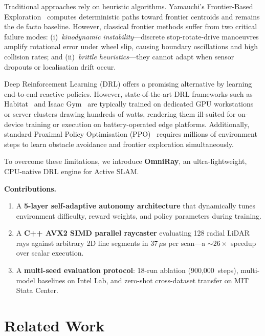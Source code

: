 \documentclass[conference]{IEEEtran}
\begin{document}
Traditional approaches rely on heuristic algorithms.
Yamauchi's Frontier-Based Exploration~\cite{yamauchi1997} computes deterministic paths toward frontier centroids and remains the de facto baseline.
However, classical frontier methods suffer from two critical failure modes: (i)~\textit{kinodynamic instability}---discrete stop-rotate-drive manoeuvres amplify rotational error under wheel slip, causing boundary oscillations and high collision rates; and (ii)~\textit{brittle heuristics}---they cannot adapt when sensor dropouts or localisation drift occur.

Deep Reinforcement Learning (DRL) offers a promising alternative by learning end-to-end reactive policies.
However, state-of-the-art DRL frameworks such as Habitat~\cite{savva2019} and Isaac Gym~\cite{makoviychuk2021} are typically trained on dedicated GPU workstations or server clusters drawing hundreds of watts, rendering them ill-suited for on-device training or execution on battery-operated edge platforms.
Additionally, standard Proximal Policy Optimisation (PPO)~\cite{schulman2017} requires millions of environment steps to learn obstacle avoidance and frontier exploration simultaneously.

To overcome these limitations, we introduce \textbf{OmniRay}, an ultra-lightweight, CPU-native DRL engine for Active SLAM.

\noindent\textbf{Contributions.}
\begin{enumerate}
    \item A \textbf{5-layer self-adaptive autonomy architecture} that dynamically tunes environment difficulty, reward weights, and policy parameters during training.
    \item A \textbf{C++ AVX2 SIMD parallel raycaster} evaluating 128 radial LiDAR rays against arbitrary 2D line segments in $37\,\mu$s per scan---a ${\sim}26\times$ speedup over scalar execution.
    \item A \textbf{multi-seed evaluation protocol}: 18-run ablation (900{,}000~steps), multi-model baselines on Intel Lab, and zero-shot cross-dataset transfer on MIT Stata Center.
\end{enumerate}

\section{Related Work}
\end{document}

